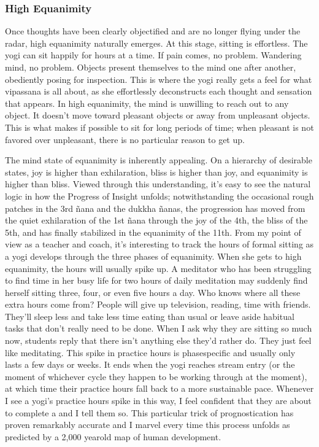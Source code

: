 \documentclass[a5paper,10pt,english]{book}
\begin{document}
\subsubsection{High Equanimity}
\label{\detokenize{main-2:high-equanimity}}
\sphinxAtStartPar
Once thoughts have been clearly objectified and are no longer flying
under the radar, high equanimity naturally emerges. At this stage,
sitting is effortless. The yogi can sit happily for hours at a time. If
pain comes, no problem. Wandering mind, no problem. Objects present
themselves to the mind one after another, obediently posing for
inspection. This is where the yogi really gets a feel for what vipassana
is all about, as she effortlessly deconstructs each thought and
sensation that appears. In high equanimity, the mind is unwilling to
reach out to any object. It doesn’t move toward pleasant objects or away
from unpleasant objects. This is what makes if possible to sit for long
periods of time; when pleasant is not favored over unpleasant, there is
no particular reason to get up.

\sphinxAtStartPar
The mind state of equanimity is inherently appealing. On a hierarchy of
desirable states, joy is higher than exhilaration, bliss is higher than
joy, and equanimity is higher than bliss. Viewed through this
understanding, it’s easy to see the natural logic in how the Progress of
Insight unfolds; notwithstanding the occasional rough patches in the 3rd
ñana and the dukkha ñanas, the progression has moved from the quiet
exhilaration of the 1st ñana through the joy of the 4th, the bliss of
the 5th, and has finally stabilized in the equanimity of the 11th. From
my point of view as a teacher and coach, it’s interesting to track the
hours of formal sitting as a yogi develops through the three phases of
equanimity. When she gets to high equanimity, the hours will usually
spike up. A meditator who has been struggling to find time in her busy
life for two hours of daily meditation may suddenly find herself sitting
three, four, or even five hours a day. Who knows where all these extra
hours come from? People will give up television, reading, time with
friends. They’ll sleep less and take less time eating than usual or
leave aside habitual tasks that don’t really need to be done. When I ask
why they are sitting so much now, students reply that there isn’t
anything else they’d rather do. They just feel like meditating. This
spike in practice hours is phase\sphinxhyphen{}specific and usually only lasts a few
days or weeks. It ends when the yogi reaches stream entry (or the 
moment of whichever cycle they happen to be working through at the
moment), at which time their practice hours fall back to a more
sustainable pace. Whenever I see a yogi’s practice hours spike in this
way, I feel confident that they are about to complete a  and I
tell them so. This particular trick of prognostication has proven
remarkably accurate and I marvel every time this process unfolds as
predicted by a 2,000 year\sphinxhyphen{}old map of human development.
\end{document}
